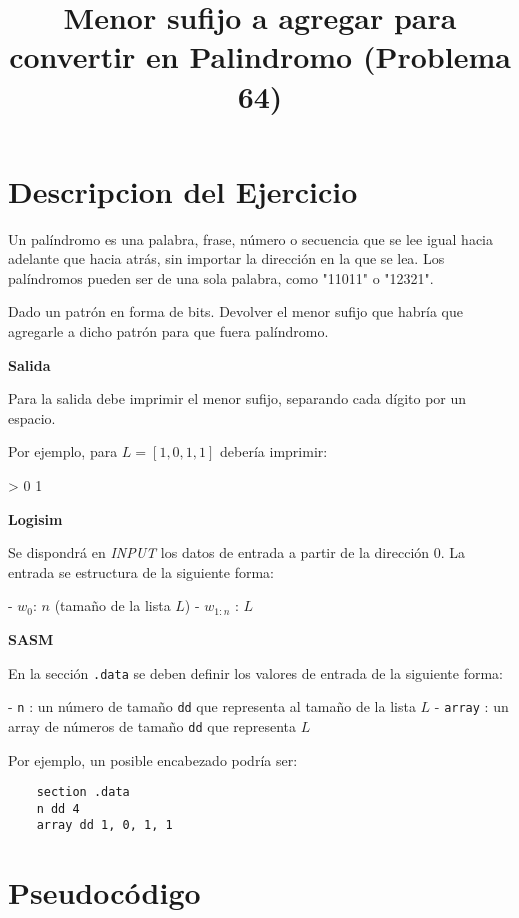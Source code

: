 \documentclass{article}
\title{Menor sufijo a agregar para convertir en Palindromo (Problema 64)}
\begin{document}
	
	\maketitle
	
	\section{Descripcion del Ejercicio}
	

Un palíndromo es una palabra, frase, número o secuencia que se lee igual hacia adelante que hacia atrás, sin importar la dirección en la que se lea. Los palíndromos pueden ser de una sola palabra, como "11011" o "12321".

Dado un patrón en forma de bits. Devolver el menor sufijo que habría que agregarle a dicho patrón para que fuera palíndromo.

\textbf{Salida}

Para la salida debe imprimir el menor sufijo, separando cada dígito por un espacio.

Por ejemplo, para $L = [1, 0, 1, 1]$ debería imprimir:

> 0 1

\textbf{Logisim}

Se dispondrá en \textit{INPUT} los datos de entrada a partir de la dirección $0$. La entrada se estructura de la siguiente forma:

- $w_0$: $n$ (tamaño de la lista $L$)
- $w_{1:n}$ : $L$

\textbf{SASM}

En la sección \texttt{.data} se deben definir los valores de entrada de la siguiente forma:

- \texttt{n} : un número de tamaño \texttt{dd} que representa al tamaño de la lista $L$
- \texttt{array} : un array de números de tamaño \texttt{dd} que representa $L$

Por ejemplo, un posible encabezado podría ser:

\begin{verbatim}
	section .data
	n dd 4
	array dd 1, 0, 1, 1
\end{verbatim}
	
	\section{Pseudocódigo}
	
\end{document}
